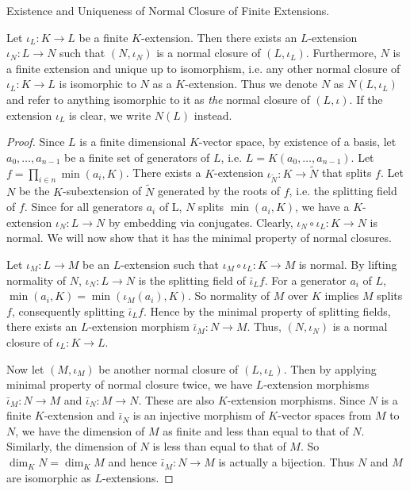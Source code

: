 \documentclass[../book.tex]{subfiles}
\begin{document}
\begin{thm} Existence and Uniqueness of Normal Closure of Finite Extensions.
    
    Let $\iota_L : K \to L$ be a finite $K$-extension. 
    Then there exists an $L$-extension $\iota_N : L \to N$ such that
    $(N,\iota_N)$ is a normal closure of $(L,\iota_L)$.
    Furthermore, $N$ is a finite extension and unique up to isomorphism, i.e.
    any other normal closure of $\iota_L : K \to L$ is
    isomorphic to $N$ as a $K$-extension. 
    Thus we denote $N$ as $N(L,\iota_L)$ and refer to anything isomorphic to it 
    as \emph{the} normal closure of $(L,\iota)$.
    If the extension $\iota_L$ is clear, we write $N(L)$ instead. 
\end{thm}
\begin{proof}
    Since $L$ is a finite dimensional $K$-vector space,
    by existence of a basis,
    let $a_0,\dots,a_{n-1}$ be a finite set of generators of $L$,
    i.e. $L = K(a_0,\dots,a_{n-1})$.
    Let $f = \prod_{i\in n} \min(a_i,K)$. 
    There exists a $K$-extension $\iota_{\tilde{N}} : K \to \tilde{N}$ 
    that splits $f$. 
    Let $N$ be the $K$-subextension of $\tilde{N}$ generated by the roots of $f$, 
    i.e. the splitting field of $f$. 
    Since for all generators $a_i$ of L, $N$ splits $\min(a_i,K)$,
    we have a $K$-extension $\iota_N : L \to N$ by embedding via conjugates.
    Clearly, $\iota_N\circ\iota_L : K \to N$ is normal. 
    We will now show that it has the minimal property of normal closures. 
    
    Let $\iota_M : L \to M$ be an $L$-extension such that 
    $\iota_M\circ\iota_L : K \to M$ is normal. 
    By lifting normality of $N$, 
    $\iota_N : L \to N$ is the splitting field of $\bar\iota_L f$. 
    For a generator $a_i$ of $L$, $\min(a_i,K) = \min(\iota_M(a_i),K)$. 
    So normality of $M$ over $K$ implies $M$ splits $f$,
    consequently splitting $\bar\iota_L f$. 
    Hence by the minimal property of splitting fields,
    there exists an $L$-extension morphism $\bar\iota_M : N \to M$.
    Thus, $(N,\iota_N)$ is a normal closure of $\iota_L : K \to L$.
    
    Now let $(M,\iota_M)$ be another normal closure of $(L,\iota_L)$. 
    Then by applying minimal property of normal closure twice,
    we have $L$-extension morphisms $\bar\iota_M : N \to M$ 
    and $\bar\iota_N : M \to N$.
    These are also $K$-extension morphisms.
    Since $N$ is a finite $K$-extension and 
    $\bar\iota_N$ is an injective morphism of $K$-vector spaces from $M$ to $N$,
    we have the dimension of $M$ as finite and less than equal to that of $N$. 
    Similarly, the dimension of $N$ is less than equal to that of $M$.
    So $\dim_K N = \dim_K M$ and hence $\bar\iota_M : N \to M$ is actually a bijection.
    Thus $N$ and $M$ are isomorphic as $L$-extensions. 
\end{proof}
\end{document}

